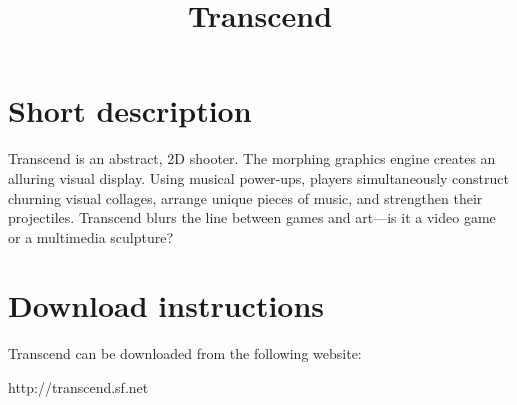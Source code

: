 \documentclass[12pt]{article}
\begin{document}
                            



\title{Transcend}
\maketitle

\section{Short description}
Transcend is an abstract, 2D shooter.  The morphing graphics engine creates an alluring visual display.  Using musical power-ups, players simultaneously construct churning visual collages, arrange unique pieces of music, and strengthen their projectiles.  Transcend blurs the line between games and art---is it a video game or a multimedia sculpture?

\section{Download instructions}

Transcend can be downloaded from the following website:

\begin{center}
http://transcend.sf.net
\end{center}

\thispagestyle{empty}
\end{document}
